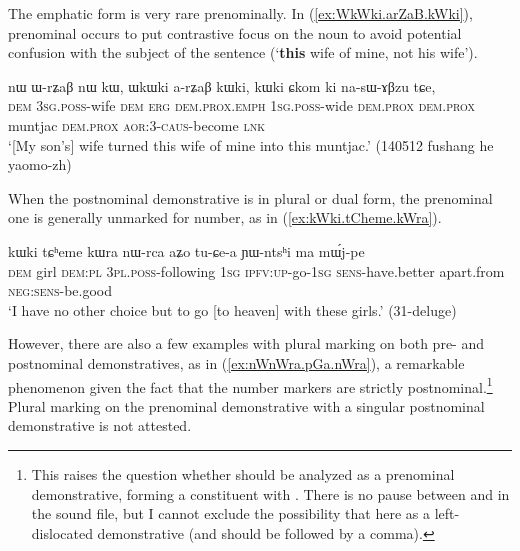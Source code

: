 The emphatic form is very rare prenominally. In (\ref{ex:WkWki.arZaB.kWki}), prenominal  occurs to put contrastive focus on the noun to avoid potential confusion with the subject of the sentence (`\textbf{this} wife of mine, not his wife').

\begin{exe}
\ex \label{ex:WkWki.arZaB.kWki}
 \gll   nɯ ɯ-rʑaβ nɯ kɯ, ɯkɯki a-rʑaβ kɯki, kɯki ɕkom ki na-sɯ-ɤβzu tɕe, \\
 \textsc{dem} \textsc{3sg}.\textsc{poss}-wife \textsc{dem} \textsc{erg} \textsc{dem}.\textsc{prox}.\textsc{emph} \textsc{1sg}.\textsc{poss}-wide \textsc{dem}.\textsc{prox} \textsc{dem}.\textsc{prox} muntjac \textsc{dem}.\textsc{prox}  \textsc{aor}:3\flobv{}-\textsc{caus}-become \textsc{lnk} \\
\glt `[My son's] wife turned this wife of mine into this muntjac.' (140512 fushang he yaomo-zh)
\end{exe}

When the postnominal demonstrative is in plural or dual form, the prenominal one is generally unmarked for number, as in (\ref{ex:kWki.tCheme.kWra}).

\begin{exe}
\ex \label{ex:kWki.tCheme.kWra}
 \gll kɯki tɕʰeme kɯra nɯ-rca aʑo tu-ɕe-a ɲɯ-ntsʰi ma mɯ́j-pe \\
 \textsc{dem} girl \textsc{dem}:\textsc{pl} \textsc{3pl}.\textsc{poss}-following \textsc{1sg} \textsc{ipfv}:\textsc{up}-go-\textsc{1sg} \textsc{sens}-have.better apart.from \textsc{neg}:\textsc{sens}-be.good \\
 \glt `I have no other choice but to go [to heaven] with these girls.' (31-deluge)
 \end{exe}

However, there are also a few examples with plural marking on both pre- and postnominal demonstratives, as in (\ref{ex:nWnWra.pGa.nWra}), a remarkable phenomenon given the fact that the number markers are strictly postnominal.\footnote{This raises the question whether  should be analyzed as a prenominal demonstrative, forming a constituent with . There is no pause between  and  in the sound file, but I cannot exclude the possibility that  here as a left-dislocated demonstrative (and should be followed by a comma).  } Plural marking on the prenominal demonstrative with a singular postnominal demonstrative is not attested.
 
